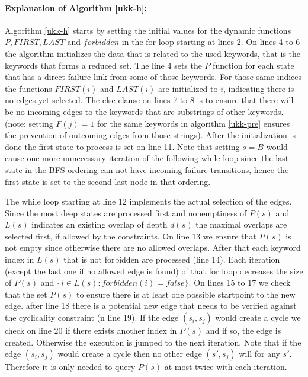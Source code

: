 \documentclass[english,twoside,censored,csm,algorithms-track-2020]{HYthesisML}
\theoremstyle{plain}
\theoremstyle{definition}
\begin{document}
\paragraph{Explanation of Algorithm \ref{ukk-h}:}
Algorithm \ref{ukk-h} starts by setting the initial values for the dynamic functions
$P, FIRST, LAST$ and $forbidden$ in the for loop starting at lines 2. On lines 4 to 6 the algorithm
initializes the data that is related to the used keywords, that is the keywords that forms a reduced set.
The line 4 sets the $P$ function for each state that has a direct failure link from some of
those keywords. For those same indices the functions $FIRST(i)$ and $LAST(i)$ are initialized
to $i$, indicating there is no edges yet selected. The else clause on lines 7 to 8 is
to ensure that there will be no incoming edges to the keywords that are substrings of other
keywords. (note: setting $F(j) = 1$ for the same keywords in algorithm \ref{ukk-pre} ensures
the prevention of outcoming edges from those strings). After the initialization is done the
first state to process is set on line 11. Note that setting $s=B$ would cause one more unnecessary
iteration of the following while loop since the last state in the BFS ordering can not have
incoming failure transitions, hence the first state is set to the second last node in that
ordering.

The while loop starting at line 12 implements the actual selection of the edges. Since the
most deep states are processed first and nonemptiness of $P(s)$ and $L(s)$ indicates an existing
overlap of depth $d(s)$ the maximal overlaps are selected first, if allowed by the constraints.
On line 13 we ensure that $P(s)$ is not empty since otherwise there are no allowed overlaps.
After that each keyword index in $L(s)$ that is not forbidden are processed (line 14). Each
iteration (except the last one if no allowed edge is found) of that for loop decreases the
size of $P(s)$ and $\{i\in L(s) : forbidden(i) = false\}$. On lines 15 to 17 we check that
the set $P(s)$ to ensure there is at least one possible startpoint to the new edge. after line 18
there is a potential new edge that needs to be verified against the cyclicality constraint
(n line 19). If the edge $(s_i,s_j)$ would create a cycle we check on line 20 if there exists
another index in $P(s)$ and if so, the edge is created. Otherwise the execution is jumped to the
next iteration. Note that if the edge $(s_i,s_j)$ would create a cycle then no other edge $(s',s_j)$
will for any $s'$. Therefore it is only needed to query $P(s)$ at most twice with each iteration.
\end{document}

